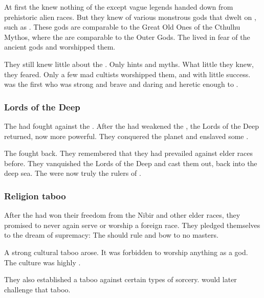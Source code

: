 At first the \ophidians knew nothing of the \xss except vague legends handed down from prehistoric alien races. 
But they knew of various monstrous gods that dwelt on \Miith, such as \Ubloth. 
These \Miithian gods are comparable to the Great Old Ones of the Cthulhu Mythos, where the \xss are comparable to the Outer Gods. 
The \ophidians lived in fear of the ancient gods and worshipped them. 

They still knew little about the \xss. 
Only hints and myths.
What little they knew, they feared.
Only a few mad cultists worshipped them, and with little success.
\Sethicus was the first who was strong and brave and daring and heretic enough to . 





\subsubsection{Lords of the Deep}
The  had fought against the \moonthings. 
After the \ophidians had weakened the \moonthings, the Lords of the Deep returned, now more powerful. 
They conquered the planet and enslaved some \ophidians. 

The \ophidians fought back. 
They remembered that they had prevailed against elder races before. 
They vanquished the Lords of the Deep and cast them out, back into the deep sea. 
The \ophidians were now truly the rulers of \Miith. 





\subsubsection{Religion taboo}
After the \ophidians had won their freedom from the Nibir and other elder races, they promised to never again serve or worship a foreign race. 
They pledged themselves to the dream of \ophidian supremacy:
The \ophidians should rule and bow to no masters. 

A strong cultural taboo arose. 
It was forbidden to worship anything as a god. 
The \ophidian culture was highly . 

They also established a taboo against certain types of sorcery. 
\Sethicus would later challenge that taboo. 









